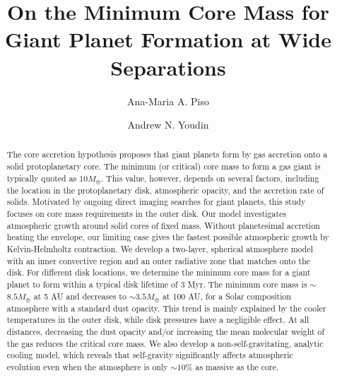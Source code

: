 \documentclass[apj, numberedappendix]{emulateapj}
\begin{document}



\title{On the Minimum Core Mass for Giant Planet Formation at Wide Separations}

\author{Ana-Maria A. Piso}

\author{Andrew N. Youdin}


\begin{abstract}

The core accretion hypothesis proposes that giant planets form by gas accretion onto a solid protoplanetary core. The minimum (or critical) core mass to form a gas giant is typically quoted as $10 M_{\oplus}$. This value, however, depends on several factors, including the location in the protoplanetary disk, atmospheric opacity, and the accretion rate of solids.  Motivated by ongoing direct imaging searches for giant planets, this study focuses on core mass requirements in the outer disk. Our model investigates atmospheric growth around solid cores of fixed mass.  Without planetesimal accretion heating the envelope, our limiting case gives the fastest possible atmospheric growth by Kelvin-Helmholtz contraction. We develop a two-layer, spherical atmosphere model with an inner convective region and an outer radiative zone that matches onto the disk.  For different disk locations, we determine the minimum core mass for a giant planet to form within a typical disk lifetime of 3 Myr.   The minimum core mass is $\sim$$8.5 M_{\oplus}$ at 5 AU and decreases to $\sim$$3.5 M_{\oplus}$ at 100 AU, for a Solar composition atmosphere with a standard dust opacity.  This trend is mainly explained by the cooler temperatures in the outer disk, while disk pressures have a negligible effect. At all distances, decreasing the dust opacity and/or increasing the mean molecular weight of the gas reduces the critical core mass. We also develop a non-self-gravitating, analytic cooling model, which reveals that self-gravity significantly affects atmospheric evolution even when the atmosphere is only $\sim$$10\%$ as massive as the core.


\end{abstract}
\end{document}
